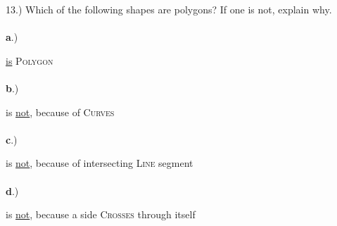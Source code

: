 \documentclass[12pt]{article}
\begin{document}
{\setlength{\parindent}{0cm}
13.) Which of the following shapes are polygons? If one is not, explain why. 
\paragraph{}\textbf{a}.) \begin{center} \underline{is} \textsc{Polygon}  \end{center} 
\paragraph{}\textbf{b}.) \begin{center} is \underline{not}, because of \textsc{Curves} \end{center} 
\paragraph{}\textbf{c}.) \begin{center} is \underline{not}, because of intersecting \textsc{Line} segment \end{center} 
\paragraph{}\textbf{d}.) \begin{center} is \underline{not}, because a side \textsc{Crosses} through itself \end{center} 
}
\end{document}
